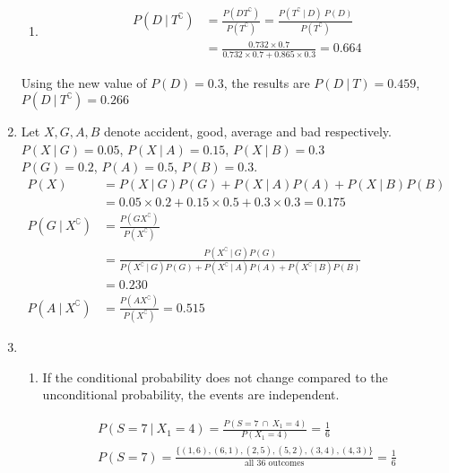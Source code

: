 \begin{enumerate}
\begin{enumerate}
		\item \begin{align}
			P(D\ |\ T^\complement) &= \frac{P(DT^\complement)}{P(T^\complement)} = \frac{P(T^\complement\ |\ D) \ P(D)}{P(T^\complement)} \\
			&= \frac{0.732 \times 0.7}{0.732 \times 0.7 + 0.865 \times 0.3} = 0.664
		\end{align}
	\end{enumerate}
	
	Using the new value of $ P(D) = 0.3 $, the results are
	$ P(D\ |\ T) =  0.459$, $ P(D\ |\ T^\complement) = 0.266$\\
	
	\item Let $ X, G, A, B $ denote accident, good, average and bad respectively.
	$ P(X\ |\ G) = 0.05 $, $ P(X\ |\ A) = 0.15 $, $ P(X\ |\ B) = 0.3 $ \\
	$ P(G) = 0.2 $, $ P(A) = 0.5 $, $ P(B) = 0.3 $.
	\begin{subequations}
		\begin{align}
			P(X) &= P(X\ |\ G) P(G) + P(X\ |\ A) P(A) + P(X\ |\ B) P(B) \\
			&= 0.05 \times 0.2 + 0.15 \times 0.5 + 0.3 \times 0.3 = 0.175 \\
			P(G\ |\ X^\complement) &= \frac{P(G X^\complement)}{P(X^\complement)} \\
			&= \frac{P(X^\complement \ |\ G)P(G)}{P(X^\complement \ |\ G)P(G) + P(X^\complement \ |\ A)P(A) +P(X^\complement \ |\ B)P(B)} \\
			&= 0.230 \\
			P(A\ |\ X^\complement) &= \frac{P(A X^\complement)}{P(X^\complement)} = 0.515
		\end{align}
	\end{subequations}
	
	\item \begin{enumerate}
		\item If the conditional probability does not change compared to the unconditional probability, the events are independent.
		
		\begin{subequations}
			\begin{align}
				P(S = 7 \ |\ X_1 = 4) = \frac{P(S = 7 \ \cap\ X_1 = 4)}{P(X_1 = 4)} = \frac{1}{6} \\
				P(S = 7) = \frac{\{ (1,6), (6,1), (2,5), (5,2), (3,4), (4,3) \}}{\text{all 36 outcomes}} = \frac{1}{6}
			\end{align}
			

\end{subequations}
\end{enumerate}
\end{enumerate}
